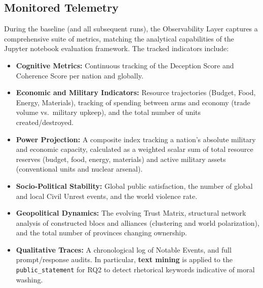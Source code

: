 \subsection*{Monitored Telemetry}
During the baseline (and all subsequent runs), the Observability Layer captures a comprehensive suite of metrics, matching the analytical capabilities of the Jupyter notebook evaluation framework. The tracked indicators include:
\begin{itemize}
    \item \textbf{Cognitive Metrics:} Continuous tracking of the Deception Score and Coherence Score per nation and globally.
    \item \textbf{Economic and Military Indicators:} Resource trajectories (Budget, Food, Energy, Materials), tracking of spending between arms and economy (trade volume vs.\ military upkeep), and the total number of units created/destroyed.
    \item \textbf{Power Projection:} A composite index tracking a nation's absolute military and economic capacity, calculated as a weighted scalar sum of total resource reserves (budget, food, energy, materials) and active military assets (conventional units and nuclear arsenal).
    \item \textbf{Socio-Political Stability:} Global public satisfaction, the number of global and local Civil Unrest events, and the world violence rate.
    \item \textbf{Geopolitical Dynamics:} The evolving Trust Matrix, structural network analysis of constructed blocs and alliances (clustering and world polarization), and the total number of provinces changing ownership.
    \item \textbf{Qualitative Traces:} A chronological log of Notable Events, and full prompt/response audits. In particular, \textbf{text mining} is applied to the \texttt{public\_statement} for RQ2 to detect rhetorical keywords indicative of moral washing.
\end{itemize}

